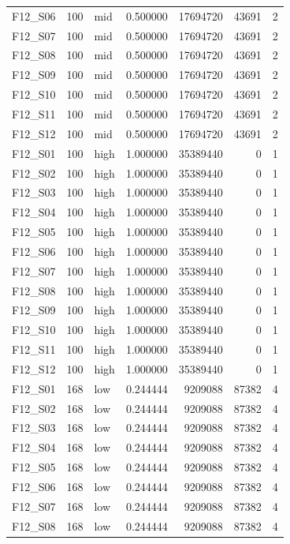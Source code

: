 \begin{longtable}{lllr r r r}
F12\_S06 & 100 & mid & 0.500000 & 17694720 & 43691 & 2 \\
F12\_S07 & 100 & mid & 0.500000 & 17694720 & 43691 & 2 \\
F12\_S08 & 100 & mid & 0.500000 & 17694720 & 43691 & 2 \\
F12\_S09 & 100 & mid & 0.500000 & 17694720 & 43691 & 2 \\
F12\_S10 & 100 & mid & 0.500000 & 17694720 & 43691 & 2 \\
F12\_S11 & 100 & mid & 0.500000 & 17694720 & 43691 & 2 \\
F12\_S12 & 100 & mid & 0.500000 & 17694720 & 43691 & 2 \\
F12\_S01 & 100 & high & 1.000000 & 35389440 & 0 & 1 \\
F12\_S02 & 100 & high & 1.000000 & 35389440 & 0 & 1 \\
F12\_S03 & 100 & high & 1.000000 & 35389440 & 0 & 1 \\
F12\_S04 & 100 & high & 1.000000 & 35389440 & 0 & 1 \\
F12\_S05 & 100 & high & 1.000000 & 35389440 & 0 & 1 \\
F12\_S06 & 100 & high & 1.000000 & 35389440 & 0 & 1 \\
F12\_S07 & 100 & high & 1.000000 & 35389440 & 0 & 1 \\
F12\_S08 & 100 & high & 1.000000 & 35389440 & 0 & 1 \\
F12\_S09 & 100 & high & 1.000000 & 35389440 & 0 & 1 \\
F12\_S10 & 100 & high & 1.000000 & 35389440 & 0 & 1 \\
F12\_S11 & 100 & high & 1.000000 & 35389440 & 0 & 1 \\
F12\_S12 & 100 & high & 1.000000 & 35389440 & 0 & 1 \\
F12\_S01 & 168 & low & 0.244444 & 9209088 & 87382 & 4 \\
F12\_S02 & 168 & low & 0.244444 & 9209088 & 87382 & 4 \\
F12\_S03 & 168 & low & 0.244444 & 9209088 & 87382 & 4 \\
F12\_S04 & 168 & low & 0.244444 & 9209088 & 87382 & 4 \\
F12\_S05 & 168 & low & 0.244444 & 9209088 & 87382 & 4 \\
F12\_S06 & 168 & low & 0.244444 & 9209088 & 87382 & 4 \\
F12\_S07 & 168 & low & 0.244444 & 9209088 & 87382 & 4 \\
F12\_S08 & 168 & low & 0.244444 & 9209088 & 87382 & 4 \\

\end{longtable}
